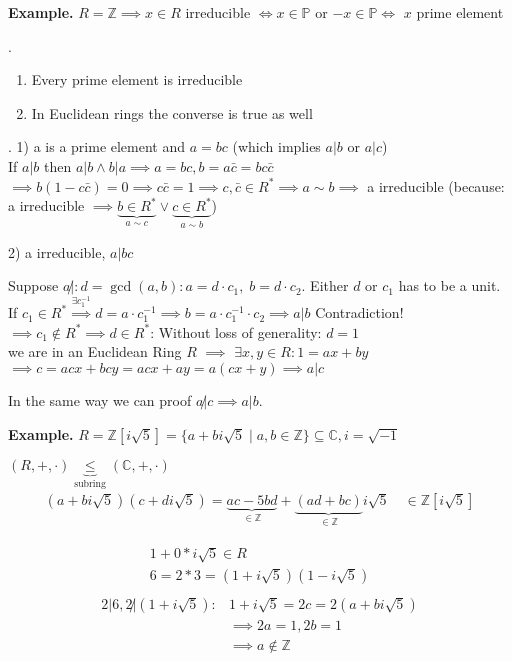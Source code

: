 \textbf{Example.}
$R = \mathbb{Z} \implies x \in R$ irreducible $\iff x \in \mathbb{P}$ or $-x \in \mathbb{P} \iff $ $x$ prime element

\Theorem.
\begin{enumerate}
  \item Every prime element is irreducible
  \item In Euclidean rings the converse is true as well
\end{enumerate}

\Proof.
1) a is a prime element and $a = bc$ (which implies $a |b$ or $a|c$)\\
If $a|b$ then $a|b \land b|a \implies a = bc, b = a\bar{c} = b c\bar{c}$\\
$\implies b(1-c\bar{c}) = 0 \implies c\bar{c} = 1 \implies c, \bar{c} \in R^{*}
\implies a \sim b \implies$ a irreducible
(because: a irreducible $\implies \underbrace{b \in R^{*}}_{a \sim c} \lor \underbrace{c \in R^{*}}_{a \sim b}$)

2) a irreducible, $a|bc$

Suppose $a \not|: d = \gcd(a,b): a = d\cdot c_1,\; b = d\cdot c_2$.
Either $d$ or $c_1$ has to be a unit.
If $c_1 \in R^{*} \stackrel{\exists c_1^{-1}}{\implies} d = a\cdot c_1^{-1} \implies b = a \cdot c_1^{-1} \cdot c_2 \implies a |b$ Contradiction! \\
$\implies c_1 \not\in R^{*} \implies d \in R^{*}$:
Without loss of generality: $d = 1$\\
we are in an Euclidean Ring $R$ $\implies$ $\exists x,y \in R: 1 = ax + by$ \\
$\implies c = acx + bcy = acx + ay = a (cx+y) \implies a|c$

In the same way we can proof $a\not|c \implies a|b$.

\textbf{Example.}
$R = \mathbb{Z} [i \sqrt{5}] = \{a+bi \sqrt{5} \mid a,b \in \mathbb{Z} \} \subseteq \mathbb{C}, i = \sqrt{-1}$

$(R,+,\cdot) \underbrace{\leq}_{\text{subring}} (\mathbb{C}, +,\cdot)$
\begin{align*}
  (a+bi \sqrt{5}) (c+di\sqrt{5}) =
    \underbrace{ac - 5bd}_{\in \mathbb{Z}} + \underbrace{(ad+bc)}_{\in \mathbb{Z}} i\sqrt{5} \quad \in \mathbb{Z}[i\sqrt{5}]
\end{align*}

\begin{align*}
  1+0 * i\sqrt{5} \in R\\
  6 = 2*3 = (1+i\sqrt{5})(1-i\sqrt{5})\\
\end{align*}
\begin{align*}
  2|6, 2 \not| (1+i\sqrt{5}): & 1+i\sqrt{5} = 2c = 2(a+bi\sqrt{5}) \\
    & \implies 2a = 1, 2b = 1 \\
    & \implies a \not\in \mathbb{Z}
\end{align*}

